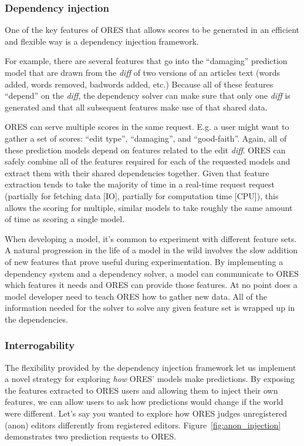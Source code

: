 \subsubsection{Dependency injection}
One of the key features of ORES that allows scores to be generated in an efficient and flexible way is a dependency injection framework.

For example, there are several features that go into the ``damaging'' prediction model that are drawn from the \emph{diff} of two versions of an articles text (words added, words removed, badwords added, etc.)  Because all of these features ``depend'' on the \emph{diff}, the dependency solver can make sure that only one \emph{diff} is generated and that all subsequent features make use of that shared data.

ORES can serve multiple scores in the same request.  E.g. a user might want to gather a set of scores: ``edit type'', ``damaging'', and ``good-faith''.  Again, all of these prediction models depend on features related to the edit \emph{diff}.  ORES can safely combine all of the features required for each of the requested models and extract them with their shared dependencies together.  Given that feature extraction tends to take the majority of time in a real-time request request (partially for fetching data [IO], partially for computation time [CPU]), this allows the scoring for multiple, similar models to take roughly the same amount of time as scoring a single model.

When developing a model, it's common to experiment with different feature sets.  A natural progression in the life of a model in the wild involves the slow addition of new features that prove useful during experimentation.  By implementing a dependency system and a dependency solver, a model can communicate to ORES which features it needs and ORES can provide those features.  At no point does a model developer need to teach ORES how to gather new data.  All of the information needed for the solver to solve any given feature set is wrapped up in the dependencies.

\subsubsection{Interrogability}
The flexibility provided by the dependency injection framework let us implement a novel strategy for exploring \emph{how} ORES' models make predictions.  By exposing the features extracted to ORES users and allowing them to inject their own features, we can allow users to ask how predictions would change if the world were different.  Let's say you wanted to explore how ORES judges unregistered (anon) editors differently from registered editors.  Figure~\ref{fig:anon_injection} demonstrates two prediction requests to ORES.


